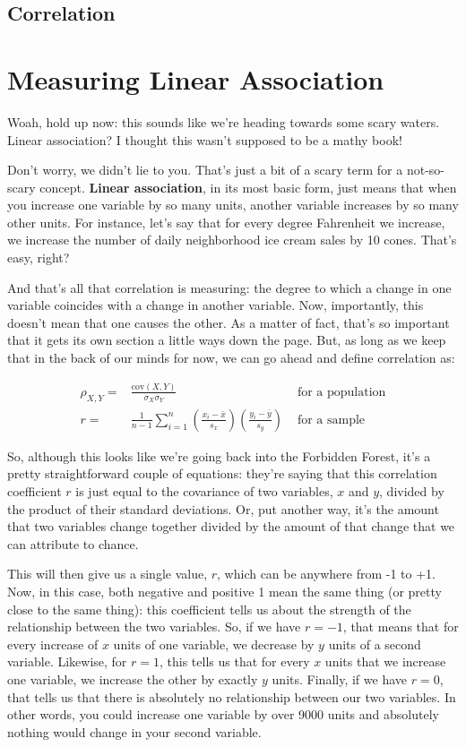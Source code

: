 \subsection{Correlation}

\section{Measuring Linear Association}
Woah, hold up now: this sounds like we're heading towards some scary waters. Linear association? I thought this wasn't supposed to be a mathy book!

Don't worry, we didn't lie to you. That's just a bit of a scary term for a not-so-scary concept. \textbf{Linear association}, in its most basic form, just means that when you increase one variable by so many units, another variable increases by so many other units. For instance, let's say that for every degree Fahrenheit we increase, we increase the number of daily neighborhood ice cream sales by 10 cones. That's easy, right?

And that's all that correlation is measuring: the degree to which a change in one variable coincides with a change in another variable. Now, importantly, this doesn't mean that one causes the other. As a matter of fact, that's so important that it gets its own section a little ways down the page. But, as long as we keep that in the back of our minds for now, we can go ahead and define correlation as:

\begin{eqnarray*}
\rho_{X,Y} =& \frac{\text{cov}(X,Y)}{\sigma_X\sigma_Y} &\text{ for a population} \\
r=& \frac{1}{n-1}\sum_{i=1}^n\left(\frac{x_i-\bar{x}}{s_x}\right)\left(\frac{y_i-\bar{y}}{s_y}\right) &\text{ for a sample}
\end{eqnarray*}

So, although this looks like we're going back into the Forbidden Forest, it's a pretty straightforward couple of equations: they're saying that this correlation coefficient \(r\) is just equal to the covariance of two variables, \(x\) and \(y\), divided by the product of their standard deviations. Or, put another way, it's the amount that two variables change together divided by the amount of that change that we can attribute to chance.

This will then give us a single value, \(r\), which can be anywhere from -1 to +1. Now, in this case, both negative and positive 1 mean the same thing (or pretty close to the same thing): this coefficient tells us about the strength of the relationship between the two variables. So, if we have \(r=-1\), that means that for every increase of \(x\) units of one variable, we decrease by \(y\) units of a second variable. Likewise, for \(r=1\), this tells us that for every \(x\) units that we increase one variable, we increase the other by exactly \(y\) units. Finally, if we have \(r=0\), that tells us that there is absolutely no relationship between our two variables. In other words, you could increase one variable by over 9000 units and absolutely nothing would change in your second variable.

